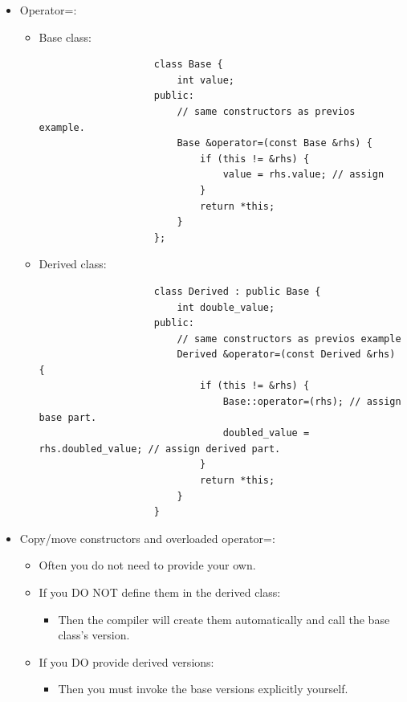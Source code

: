 \begin{itemize}
    
    \item Operator=:
        \begin{itemize}
            \item Base class:
                \begin{verbatim}
                    class Base {
                        int value;
                    public:
                        // same constructors as previos example.
                        Base &operator=(const Base &rhs) {
                            if (this != &rhs) {
                                value = rhs.value; // assign
                            }
                            return *this;
                        }
                    };
                \end{verbatim}
            
            \item Derived class:
                \begin{verbatim}
                    class Derived : public Base {
                        int double_value;
                    public:
                        // same constructors as previos example
                        Derived &operator=(const Derived &rhs) {
                            if (this != &rhs) {
                                Base::operator=(rhs); // assign base part.
                                doubled_value = rhs.doubled_value; // assign derived part.
                            }
                            return *this;
                        }
                    }
                \end{verbatim}
        \end{itemize}
        
    \item Copy/move constructors and overloaded operator=:
        \begin{itemize}
            \item Often you do not need to provide your own.
            \item If you DO NOT define them in the derived class:
                \begin{itemize}
                    \item Then the compiler will create them automatically and call the base class's version.
                \end{itemize}
            
            \item If you DO provide derived versions:
                \begin{itemize}
                    \item Then you must invoke the base versions explicitly yourself.
                \end{itemize}


\end{itemize}
\end{itemize}

